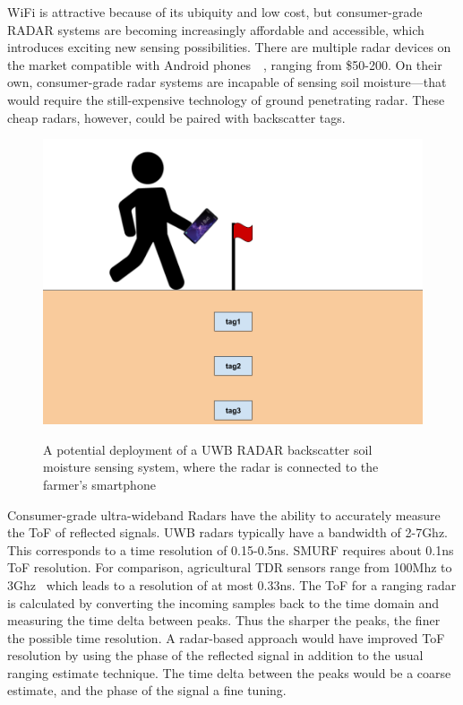 \documentclass[12pt]{article}
\begin{document}
WiFi is attractive because of its ubiquity and low cost, but
consumer-grade RADAR systems are becoming increasingly affordable and
accessible, which introduces exciting new sensing possibilities. There
are multiple radar devices on the market compatible with Android
phones~\cite{walabot}~\cite{omnipresense}, ranging from \$50-200. On their own,
consumer-grade radar systems are incapable of sensing soil
moisture---that would require the still-expensive technology of ground
penetrating radar. These cheap radars, however, could be paired with
backscatter tags.

\begin{figure}[h!]
  \centering
  \includegraphics[scale=0.4]{soil_moisture_diagram.png}\\
  \caption{A potential deployment of a UWB RADAR backscatter soil
    moisture sensing system, where the radar is connected to the
    farmer's smartphone}
\end{figure}

Consumer-grade ultra-wideband Radars have the ability to accurately
measure the ToF of reflected signals. UWB radars typically have a
bandwidth of 2-7Ghz. This corresponds to a time resolution of
0.15-0.5ns. SMURF requires about 0.1ns ToF resolution. For
comparison, agricultural TDR sensors range from 100Mhz to
3Ghz~\cite{Pelletier2012} which leads to a resolution of at most
0.33ns. The ToF for a ranging radar is calculated by converting the
incoming samples back to the time domain and measuring the time delta
between peaks. Thus the sharper the peaks, the finer the possible time
resolution. A radar-based approach would have improved ToF resolution
by using the phase of the reflected signal in addition to the usual
ranging estimate technique. The time delta between the peaks would be
a coarse estimate, and the phase of the signal a fine tuning.
\end{document}
